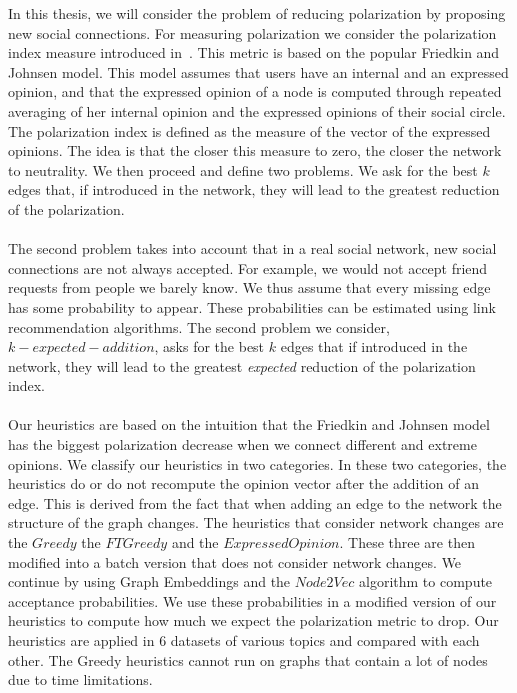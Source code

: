 In this thesis, we will consider the problem of reducing polarization by proposing new social connections. For measuring polarization we consider the polarization index measure introduced in~\cite{tsapMatakosTerzi}. This metric is based on the popular Friedkin and Johnsen model. This model assumes that users have an internal and an expressed opinion, and that the expressed opinion of a node is computed through repeated averaging of her internal opinion and the expressed opinions of their social circle. The polarization index is defined as the measure of the vector of the expressed opinions. The idea is that the closer this measure to zero, the closer the network to neutrality. We then proceed and define two problems. We ask for the best $k$ edges that, if introduced in the network, they will lead to the greatest reduction of the polarization. 
\\
\\
The second problem takes into account that in a real social network, new social connections are not always accepted. For example, we would not accept friend requests from people we barely know. We thus assume that every missing edge has some probability to appear. These probabilities can be estimated using link recommendation algorithms. The second problem we consider, $k-expected-addition$, asks for the best $k$ edges that if introduced in the network, they will lead to the greatest \emph{expected} reduction of the polarization index.
\\
\\
Our heuristics are based on the intuition that the Friedkin and Johnsen model has the biggest polarization decrease when we connect different and extreme opinions. We classify our heuristics in two categories. In these two categories, the heuristics do or do not recompute the opinion vector after the addition of an edge. This is derived from the fact that when adding an edge to the network the structure of the graph changes. The heuristics that consider network changes are the $Greedy$ the $FTGreedy$ and the $Expressed Opinion$. These three are then modified into a batch version that does not consider network changes. We continue by using Graph Embeddings and the $Node2Vec$ algorithm to compute acceptance probabilities. We use these probabilities in a modified version of our heuristics to compute how much we expect the polarization metric to drop. Our heuristics are applied in 6 datasets of various topics and compared with each other. The Greedy heuristics cannot run on graphs that contain a lot of nodes due to time limitations.

